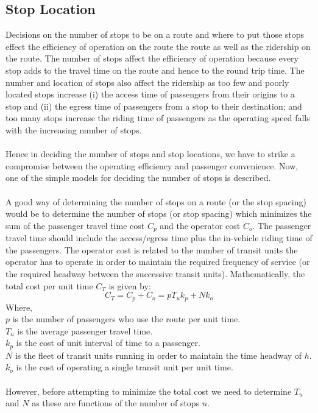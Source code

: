 \subsection{Stop Location}
Decisions on the number of stops to be on a route and where to put those stops effect the efficiency of operation on the route the route as well as the ridership on the route. The number of stops affect the efficiency of operation because every stop adds to the travel time on the route and hence to the round trip time. The number and location of stops also affect the ridership as too few and poorly located stops increase (i) the access time of passengers from their origins to a stop and (ii) the egress time of passengers from a stop to their destination; and too many stops increase the riding time of passengers as the operating speed falls with the increasing number of stops.\\\\
Hence in deciding the number of stops and stop locations, we have to strike a compromise between the operating efficiency and passenger convenience. Now, one of the simple models for deciding the number of stops is described.\\\\
A good way of determining the number of stops on a route (or the stop spacing) would be to determine the number of stops (or stop spacing) which minimizes the sum of the passenger travel time cost $C_p$ and the operator cost $C_o$. The passenger travel time should include the access/egress time plus the in-vehicle riding time of the passengers. The operator cost is related to the number of transit units the operator has to operate in order to maintain the required frequency of service (or the required headway between the successive transit units). Mathematically, the total cost per unit time $C_T$ is given by:
\begin{equation}
	C_T = C_p + C_o = pT_uk_p + Nk_o
\end{equation}
Where,\\
\hspace*{10mm} $p$ is the number of passengers who use the route per unit time.\\
\hspace*{10mm} $T_u$ is the average passenger travel time.\\
\hspace*{10mm} $k_p$ is the cost of unit interval of time to a passenger.\\
\hspace*{10mm} $N$ is the fleet of transit units running in order to maintain the time headway of $h$.\\
\hspace*{10mm} $k_o$ is the cost of operating a single transit unit per unit time.\\\\
However, before attempting to minimize the total cost we need to determine $T_u$ and $N$ as these are functions of the number of stops $n$.
